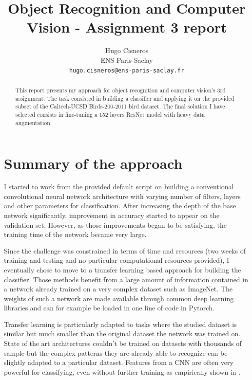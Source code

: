 \documentclass[10pt,twocolumn,letterpaper]{article}
\begin{document}
\title{Object Recognition and Computer Vision  - Assignment 3  report}

\author{Hugo Cisneros\\
ENS Paris-Saclay\\
{\tt\small hugo.cisneros@ens-paris-saclay.fr}}


\maketitle
\thispagestyle{empty}

\begin{abstract}
This report presents my approach for object recognition and computer vision's 3rd assignment. The task consisted in building a classifier and applying it on the provided subset of the Caltech-UCSD Birds-200-2011 bird dataset.
The final solution I have selected consists in fine-tuning a 152 layers ResNet \cite{DBLP:journals/corr/HeZRS15} model with heavy data augmentation.
\end{abstract}

\section{Summary of the approach}

I started to work from the provided default script on building a conventional convolutional neural network architecture \cite{lecun-bengio-95a}  with varying number of filters, layers and other parameters for classification. After increasing the depth of the base network significantly, improvement in accuracy started to appear on the validation set. However, as those improvements began to be satisfying, the training time of the network became very large. 

Since the challenge was constrained in terms of time and resources (two weeks of training and testing and no particular computational resources provided), I eventually chose to move to a transfer learning based approach for building the classifier. Those methods benefit from a large amount of information contained in a network already trained on a very complex dataset such as ImageNet. The weights of such a network are made available through common deep learning libraries and can for example be loaded in one line of code in Pytorch. 

Transfer learning is particularly adapted to tasks where the studied dataset is similar but much smaller than the original dataset the network was trained on. State of the art architectures couldn't be trained on datasets with thousands of sample but the complex patterns they are already able to recognize can be slightly adapted to a particular dataset. Features from a CNN are often very powerful for classifying, even without further training as empirically shown in \cite{DBLP:journals/corr/RazavianASC14}.
\end{document}
